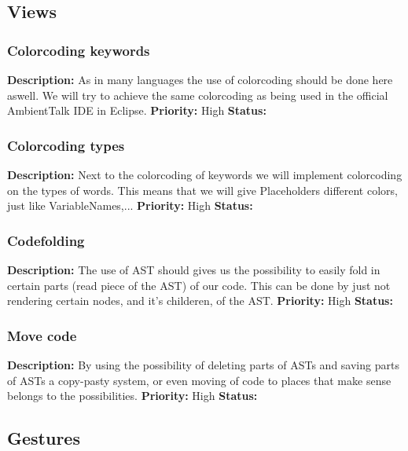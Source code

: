 \documentclass{article}
\begin{document}
\subsection{Views}
\subsubsection{Colorcoding keywords}
\textbf{Description: }As in many languages the use of colorcoding should be done here aswell. We  will try to achieve the same colorcoding as
being used in the official AmbientTalk IDE in Eclipse. \newline
\textbf{Priority:} High \newline
\textbf{Status: } \newline
\subsubsection{Colorcoding types}
\textbf{Description: } Next to the colorcoding of keywords we will implement colorcoding on the types of words. This means that we will give
Placeholders different colors, just like VariableNames,... \newline
\textbf{Priority:} High \newline
\textbf{Status: } \newline
\subsubsection{Codefolding}
\textbf{Description: }The use of AST should gives us the possibility to easily fold in certain parts (read piece of the AST) of our code. This can be done by just not
rendering certain nodes, and it's childeren, of the AST. \newline
\textbf{Priority:} High \newline
\textbf{Status: } \newline
\subsubsection{Move code}
\textbf{Description: } By using the possibility of deleting parts of ASTs and saving parts of ASTs a copy-pasty system, or even moving of code to places that make sense belongs
to the possibilities.\newline
\textbf{Priority:} High \newline
\textbf{Status: } \newline
\subsection{Gestures}
\end{document}
